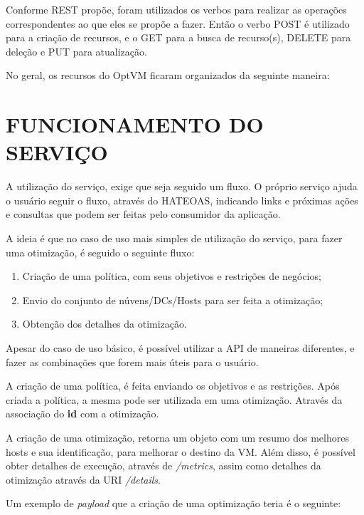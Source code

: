 Conforme REST propõe, foram utilizados os verbos para realizar as operações correspondentes
ao que eles se propõe a fazer. Então o verbo POST é utilizado para a criação de recursos,
e o GET para a busca de recurso(s), DELETE para deleção e PUT para atualização.

No geral, os recursos do OptVM ficaram organizados da seguinte maneira:





\section{FUNCIONAMENTO DO SERVIÇO}

A utilização do serviço, exige que seja seguido um fluxo. O próprio serviço 
ajuda o usuário seguir o fluxo, através do HATEOAS, indicando links e próximas
ações e consultas que podem ser feitas pelo consumidor da aplicação.

A ideia é que no caso de uso mais simples de utilização do serviço, 
para fazer uma otimização, é seguido o seguinte fluxo:

\begin{enumerate}
 \item Criação de uma política, com seus objetivos e restrições de negócios;
 \item Envio do conjunto de núvens/DCs/Hosts para ser feita a otimização;
 \item Obtenção dos detalhes da otimização.
\end{enumerate}

Apesar do caso de uso básico, é possível utilizar a API de maneiras diferentes,
e fazer as combinações que forem mais úteis para o usuário.

A criação de uma política, é feita enviando os objetivos e as restrições.
Após criada a política, a mesma pode ser utilizada em uma otimização. Através da
associação do \textbf{id} com a otimização.



A criação de uma otimização, retorna um objeto com um resumo dos melhores hosts
e sua identificação, para melhorar o destino da VM.
Além disso, é possível obter detalhes de execução, através de \textit{/metrics}, assim
como detalhes da otimização através da URI \textit{/details}.

Um exemplo de \textit{payload} que a criação de uma optimização teria é o seguinte:

